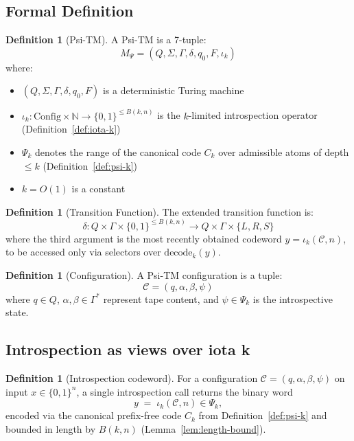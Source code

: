 \documentclass[11pt]{article}
\theoremstyle{plain}
\theoremstyle{definition}
\newtheorem{definition}[theorem]{Definition}
\newcommand{\bits}{\{0,1\}}
\begin{document}
\subsection{Formal Definition}

\begin{definition}[Psi-TM]
A Psi-TM is a 7-tuple:
$$M_\Psi = (Q, \Sigma, \Gamma, \delta, q_0, F, \iota_k)$$
where:
\begin{itemize}
\item $(Q, \Sigma, \Gamma, \delta, q_0, F)$ is a deterministic Turing machine
\item $\iota_k: \mathrm{Config}\times \mathbb{N} \to \{0,1\}^{\le B(k,n)}$ is the $k$-limited introspection operator (Definition~\ref{def:iota-k})
\item $\Psi_k$ denotes the range of the canonical code $C_k$ over admissible atoms of depth $\le k$ (Definition~\ref{def:psi-k})
\item $k = O(1)$ is a constant
\end{itemize}
\end{definition}

\begin{definition}[Transition Function]
The extended transition function is:
$$\delta: Q \times \Gamma \times \bits^{\le B(k,n)} \to Q \times \Gamma \times \{L, R, S\}$$
where the third argument is the most recently obtained codeword $y=\iota_k(\mathcal{C},n)$, to be accessed only via selectors over $\mathrm{decode}_k(y)$.
\end{definition}

\begin{definition}[Configuration]
A Psi-TM configuration is a tuple:
$$\mathcal{C} = (q, \alpha, \beta, \psi)$$
where $q \in Q$, $\alpha, \beta \in \Gamma^*$ represent tape content, and $\psi \in \Psi_k$ is the introspective state.
\end{definition}

\subsection{Introspection as views over iota k}

\begin{definition}[Introspection codeword]
For a configuration $\mathcal{C}=(q,\alpha,\beta,\psi)$ on input $x\in\bits^n$, a single introspection call returns the binary word
\[
y \;=\; \iota_k(\mathcal{C},n)\in\Psi_k,
\]
encoded via the canonical prefix-free code $C_k$ from Definition~\ref{def:psi-k} and bounded in length by $B(k,n)$ (Lemma~\ref{lem:length-bound}).
\end{definition}
\end{document}
